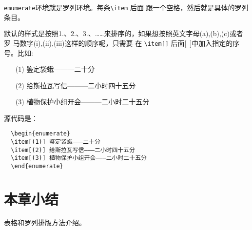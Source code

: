 \texttt{emumerate}环境就是罗列环境。每条\verb|\item| 后面
跟一个空格，然后就是具体的罗列条目。

默认的样式是按照1.、2.、3.、……来排序的，如果想按照英文字母(a),(b),(c)或者罗
马数字(i),(ii),(iii)这样的顺序呢，只需要
在 \verb|\item[]| 后面[~]中加入指定的序号。比如:
\begin{enumerate}
  \item[(1)] 鉴定袋蛾———二十分
  \item[(2)] 给斯拉瓦写信———二小时四十五分
  \item[(3)] 植物保护小组开会———二小时二十五分
\end{enumerate}
源代码是：
\begin{lstlisting}
  \begin{enumerate}
  \item[(1)] 鉴定袋蛾———二十分
  \item[(2)] 给斯拉瓦写信———二小时四十五分
  \item[(3)] 植物保护小组开会———二小时二十五分
  \end{enumerate}
\end{lstlisting}

\section*{本章小结}
表格和罗列排版方法介绍。
